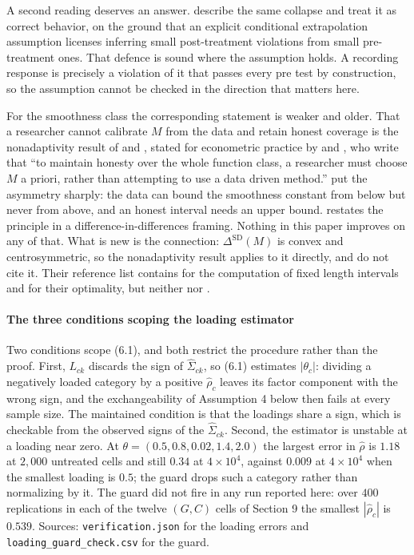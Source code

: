 \documentclass[12pt]{article}
\theoremstyle{definition}
\numberwithin{equation}{section}
\begin{document}
A second reading deserves an answer. \citet{mikhaeil2025valid} describe the same
collapse and treat it as correct behavior, on the ground that an explicit
conditional extrapolation assumption licenses inferring small post-treatment violations from small pre-treatment ones. That defence is sound where the
assumption holds. A recording response is precisely a violation of it that
passes every pre test by construction, so the assumption cannot be checked in
the direction that matters here.

For the smoothness class the corresponding statement is weaker and older. That a
researcher cannot calibrate $M$ from the data and retain honest coverage is the
nonadaptivity result of \citet{low1997nonparametric} and
\citet{cailow2004adaptation}, stated for econometric practice by
\citet{armstrong2018optimal} and \citet{armstrong2020simple}, who write that ``to
maintain honesty over the whole function class, a researcher must choose $M$ a
priori, rather than attempting to use a data driven method.''
\citet{kolesar2018discrete} put the asymmetry sharply: the data can bound the
smoothness constant from below but never from above, and an honest interval
needs an upper bound. \citet{freeman2026local} restates the principle in a
difference-in-differences framing. Nothing in this paper improves on any of
that. What is new is the connection: $\Delta^{\mathrm{SD}}(M)$ is convex and
centrosymmetric, so the nonadaptivity result applies to it directly, and
\citet{rambachan2023credible} do not cite it. Their reference list contains
\citet{low1995bias} for the computation of fixed length intervals and
\citet{armstrong2018optimal,armstrong2020simple} for their optimality, but
neither \citet{low1997nonparametric} nor \citet{cailow2004adaptation}.

\paragraph{The three conditions scoping the loading estimator}

Two conditions scope (6.1), and both restrict the procedure rather
than the proof. First, $L_{ck}$ discards the sign of $\hat{\Sigma}_{ck}$, so
(6.1) estimates $|\theta_c|$: dividing a negatively loaded category
by a positive $\hat{\rho}_c$ leaves its factor component with the wrong sign,
and the exchangeability of Assumption 4 below then fails at every
sample size. The maintained condition is that the loadings share a sign, which is checkable from the
observed signs of the $\hat{\Sigma}_{ck}$. Second, the estimator is unstable at
a loading near zero. At $\theta = (0.5,0.8,0.02,1.4,2.0)$ the largest error in
$\hat{\rho}$ is $1.18$ at $2{,}000$ untreated cells and still $0.34$ at
$4 \times 10^4$, against $0.009$ at $4 \times 10^4$ when the smallest loading is
$0.5$; the guard drops such a category rather than normalizing by it. The guard
did not fire in any run reported here: over $400$ replications in each of the
twelve $(G,C)$ cells of Section 9 the smallest $|\hat{\rho}_c|$ is
$0.539$. Sources: \texttt{verification.json} for the loading errors and
\texttt{loading\_guard\_check.csv} for the guard.
\end{document}
